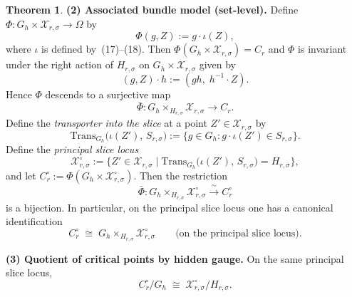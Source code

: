 \documentclass{article}
\theoremstyle{definition}
\newtheorem{theorem}{Theorem}[section]
\begin{document}
\begin{theorem}
\medskip\noindent
\textbf{(2) Associated bundle model (set-level).}
Define $\Phi \colon G_h \times \mathcal X_{r,\sigma} \to \Omega$ by
\begin{equation}\tag{23}
\Phi(g, Z) := g \cdot \iota(Z),
\end{equation}
where $\iota$ is defined by~(17)--(18).  Then $\Phi(G_h \times \mathcal X_{r,\sigma}) = C_r$ and $\Phi$ is invariant under the right action of $H_{r,\sigma}$ on $G_h \times \mathcal X_{r,\sigma}$ given by
\begin{equation}\tag{24}
(g, Z) \cdot h := (g h,\; h^{-1} \cdot Z).
\end{equation}
Hence $\Phi$ descends to a surjective map
\[
\bar\Phi \colon G_h \times_{H_{r,\sigma}} \mathcal X_{r,\sigma} \longrightarrow C_r.
\]
Define the \emph{transporter into the slice} at a point $Z' \in \mathcal X_{r,\sigma}$ by
\[
\mathrm{Trans}_{G_h}\!\bigl(\iota(Z'),\, S_{r,\sigma}\bigr)
:= \bigl\{ g \in G_h : g \cdot \iota(Z') \in S_{r,\sigma} \bigr\}.
\]
Define the \emph{principal slice locus}
\[
\mathcal X_{r,\sigma}^{\circ} := \bigl\{ Z' \in \mathcal X_{r,\sigma} \;\big|\;
\mathrm{Trans}_{G_h}\!\bigl(\iota(Z'),\, S_{r,\sigma}\bigr) = H_{r,\sigma} \bigr\},
\]
and let $C_r^{\circ} := \Phi(G_h \times \mathcal X_{r,\sigma}^{\circ})$.
Then the restriction
\[
\bar\Phi \colon G_h \times_{H_{r,\sigma}} \mathcal X_{r,\sigma}^{\circ}
\xrightarrow{\;\sim\;} C_r^{\circ}
\]
is a bijection.  In particular, on the principal slice locus one has a canonical identification
\begin{equation}\tag{25}
C_r^{\circ} \;\cong\; G_h \times_{H_{r,\sigma}} \mathcal X_{r,\sigma}^{\circ}
\qquad\text{(on the principal slice locus).}
\end{equation}

\medskip\noindent
\textbf{(3) Quotient of critical points by hidden gauge.}  On the same principal slice locus,
\begin{equation}\tag{26}
C_r^{\circ} / G_h \;\cong\; \mathcal X_{r,\sigma}^{\circ} / H_{r,\sigma}.
\end{equation}
\end{theorem}
\end{document}
